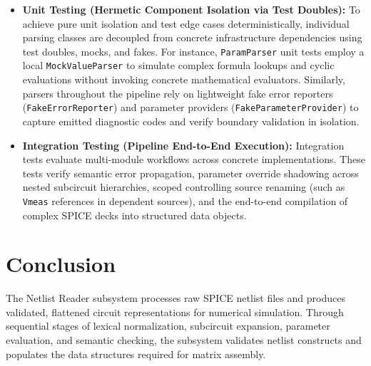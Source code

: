 \begin{itemize}
    \item \textbf{Unit Testing (Hermetic Component Isolation via Test Doubles):} To achieve pure unit isolation and test edge cases deterministically, individual parsing classes are decoupled from concrete infrastructure dependencies using test doubles, mocks, and fakes. For instance, \texttt{ParamParser} unit tests employ a local \texttt{MockValueParser} to simulate complex formula lookups and cyclic evaluations without invoking concrete mathematical evaluators. Similarly, parsers throughout the pipeline rely on lightweight fake error reporters (\texttt{FakeErrorReporter}) and parameter providers (\texttt{FakeParameterProvider}) to capture emitted diagnostic codes and verify boundary validation in isolation.
    \item \textbf{Integration Testing (Pipeline End-to-End Execution):} Integration tests evaluate multi-module workflows across concrete implementations. These tests verify semantic error propagation, parameter override shadowing across nested subcircuit hierarchies, scoped controlling source renaming (such as \texttt{Vmeas} references in dependent sources), and the end-to-end compilation of complex SPICE decks into structured data objects.
\end{itemize}


\section{Conclusion}

The Netlist Reader subsystem processes raw SPICE netlist files and produces validated, flattened circuit representations for numerical simulation. Through sequential stages of lexical normalization, subcircuit expansion, parameter evaluation, and semantic checking, the subsystem validates netlist constructs and populates the data structures required for matrix assembly.
